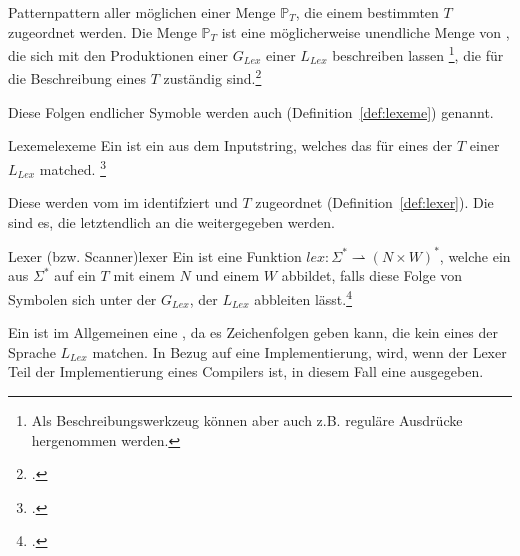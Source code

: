 \begin{Definition}{Pattern}{pattern}
   aller möglichen  einer Menge $\mathbb{P}_{T}$, die einem bestimmten  $T$ zugeordnet werden.
  Die Menge $\mathbb{P}_{T}$ ist eine möglicherweise unendliche Menge von , die sich mit den Produktionen einer  ${G}_{Lex}$ einer  ${L}_{Lex}$ beschreiben lassen \footnote{Als Beschreibungswerkzeug können aber auch z.B. reguläre Ausdrücke hergenommen werden.}, die für die Beschreibung eines  $T$ zuständig sind.\footcite{noauthor_what_nodate}
\end{Definition}

Diese Folgen endlicher Symoble werden auch  (Definition~\ref{def:lexeme}) genannt.

\begin{Definition}{Lexeme}{lexeme}
  Ein  ist ein  aus dem Inputstring, welches das  für eines der  $T$ einer  ${L}_{Lex}$ matched.
\footcite{noauthor_what_nodate}
\end{Definition}

Diese  werden vom  im  identifziert und  $T$ zugeordnet (Definition~\ref{def:lexer}). Die  sind es, die letztendlich an die  weitergegeben werden.

\begin{Definition}{Lexer (bzw. Scanner)}{lexer}
  Ein  ist eine  Funktion \hspace{0.2cm}$lex: \Sigma^{*} \rightharpoonup (N \times W)^{*}$, welche ein  aus $\Sigma^{*}$ auf ein  $T$ mit einem  $N$ und einem  $W$ abbildet, falls diese Folge von Symbolen sich unter der  ${G}_{Lex}$, der  ${L_{Lex}}$ abbleiten lässt.\footcite{noauthor_lecture-notes-2021_2022}
\end{Definition}

Ein  ist im Allgemeinen eine , da es Zeichenfolgen geben kann, die kein  eines  der Sprache $L_{Lex}$ matchen. In Bezug auf eine Implementierung, wird, wenn der Lexer Teil der Implementierung eines Compilers ist, in diesem Fall eine  ausgegeben.

